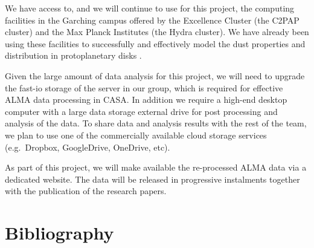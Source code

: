 \documentclass[10pt,fleqn,twoside]{article}
\begin{document}
We have access to, and we will continue to use for this project, the computing facilities in the Garching campus offered by the Excellence Cluster (the C2PAP cluster) and the Max Planck Institutes (the Hydra cluster). We have already been using these facilities to successfully and effectively model the dust properties and distribution in protoplanetary disks \citep{2016A&A...588A.112G,2016A&A...588A..53T,TazzariPhD}.

Given the large amount of data analysis for this project, we will need to upgrade the fast-io storage of the server in our group, which is required for effective ALMA data processing in CASA. In addition we require a high-end desktop computer with a large data storage external drive for post processing and analysis of the data. To share data and analysis results with the rest of the team, we plan to use one of the commercially available cloud storage services (e.g.\ Dropbox, GoogleDrive, OneDrive, etc). 

As part of this project, we will make available the re-processed ALMA data via a dedicated website. The data will be released in progressive instalments together with the publication of the research papers.

% 
% 
% 

\section{Bibliography}

\begingroup
\renewcommand{\section}[2]{}%
%


\endgroup
\end{document}
